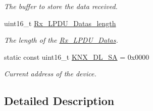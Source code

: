 \begin{DoxyCompactItemize}
\begin{DoxyCompactList}\small\item\em The buffer to store the data received. \end{DoxyCompactList}\item 
uint16\+\_\+t \hyperlink{group___k_n_x___d_l___private___consts_ga4b450ebeedfcc1afdf128fe600be3f73}{Rx\+\_\+\+L\+P\+D\+U\+\_\+\+Datas\+\_\+length}\hypertarget{group___k_n_x___d_l___private___consts_ga4b450ebeedfcc1afdf128fe600be3f73}{}\label{group___k_n_x___d_l___private___consts_ga4b450ebeedfcc1afdf128fe600be3f73}

\begin{DoxyCompactList}\small\item\em The length of the \hyperlink{group___k_n_x___d_l___private___consts_gacbfe30d397d569ba00fc3e27f4f3d782}{Rx\+\_\+\+L\+P\+D\+U\+\_\+\+Datas}. \end{DoxyCompactList}\item 
static const uint16\+\_\+t \hyperlink{group___k_n_x___d_l___private___consts_ga2b7e3f895f199cee7da6f73056ad3645}{K\+N\+X\+\_\+\+D\+L\+\_\+\+SA} = 0x0000\hypertarget{group___k_n_x___d_l___private___consts_ga2b7e3f895f199cee7da6f73056ad3645}{}\label{group___k_n_x___d_l___private___consts_ga2b7e3f895f199cee7da6f73056ad3645}

\begin{DoxyCompactList}\small\item\em Current address of the device. \end{DoxyCompactList}\end{DoxyCompactItemize}


\subsection{Detailed Description}
